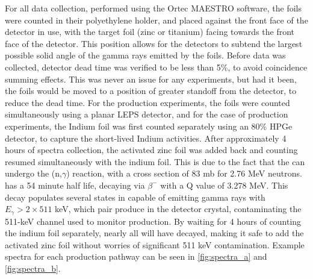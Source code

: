 \documentclass[5p]{elsarticle}
\begin{document}
For all data collection, performed using the Ortec MAESTRO software, the foils were counted in their polyethylene holder, and placed against the front face of the detector in use, with the target foil (zinc or titanium) facing towards the front face of the detector. This position allows for the detectors to subtend the largest possible solid angle of the gamma rays emitted by the foils. Before data was collected, detector dead time was verified to be less than 5\%, to avoid coincidence summing effects. This was never an issue for any experiments, but had it been, the foils would be moved to a position of greater standoff from the detector, to reduce the dead time.  For the   production experiments, the foils were counted simultaneously using a planar LEPS detector, and for the case of  production experiments, the Indium foil was first counted separately using an 80\% HPGe detector, to capture the short-lived Indium activities. After approximately 4 hours of spectra collection, the activated zinc foil was added back and counting resumed simultaneously with the indium foil. This is due to the fact that the  can undergo the (n,$\gamma$) reaction, with a cross section of 83 mb for 2.76 MeV neutrons.  has a 54 minute half life, decaying via $\beta^-$ with a Q value of 3.278 MeV. This decay populates several states in  capable of emitting gamma rays with $E_\gamma > 2 \times 511$  keV, which pair produce in the detector crystal, contaminating the 511-keV channel used to monitor   production. By waiting for 4 hours of counting the indium foil separately, nearly all  will have decayed, making it safe to add the activated zinc foil without worries of significant 511 keV contamination. Example spectra for each production pathway can be seen in \autoref{fig:spectra_a} and \autoref{fig:spectra_b}.
\end{document}
